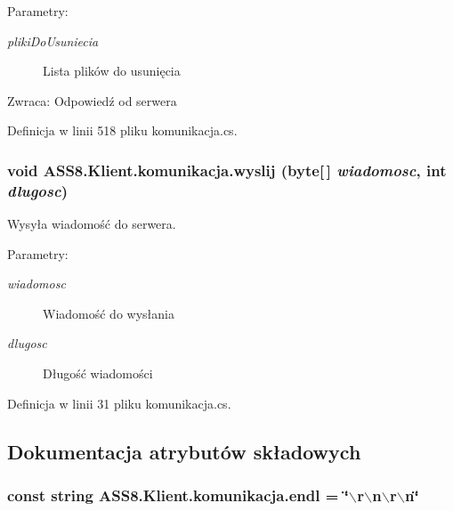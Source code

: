 \begin{Desc}
\item[Parametry:]
\begin{description}
\item[{\em plikiDoUsuniecia}]Lista plików do usunięcia\end{description}
\end{Desc}
\begin{Desc}
\item[Zwraca:]Odpowiedź od serwera\end{Desc}


Definicja w linii 518 pliku komunikacja.cs.\hypertarget{a00013_5069ee8ced0e023865e277f07ba690a9}{
\subsubsection[{wyslij}]{\setlength{\rightskip}{0pt plus 5cm}void ASS8.Klient.komunikacja.wyslij (byte\mbox{[}$\,$\mbox{]} {\em wiadomosc}, \/  int {\em dlugosc})}}
\label{d7/dd4/a00013_5069ee8ced0e023865e277f07ba690a9}


Wysyła wiadomość do serwera. 

\begin{Desc}
\item[Parametry:]
\begin{description}
\item[{\em wiadomosc}]Wiadomość do wysłania\item[{\em dlugosc}]Długość wiadomości\end{description}
\end{Desc}


Definicja w linii 31 pliku komunikacja.cs.

\subsection{Dokumentacja atrybutów składowych}
\hypertarget{a00013_2c01e8a98bfa8f0404b94af607eacbba}{
\subsubsection[{endl}]{\setlength{\rightskip}{0pt plus 5cm}const string {\bf ASS8.Klient.komunikacja.endl} = \char`\"{}$\backslash$r$\backslash$n$\backslash$r$\backslash$n\char`\"{}}}
\label{d7/dd4/a00013_2c01e8a98bfa8f0404b94af607eacbba}




